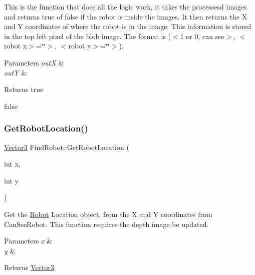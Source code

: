 This is the function that does all the logic work, it takes the processesd images and returns true of false if the robot is inside the images. It then returns the X and Y coordinates of where the robot is in the image. This information is stored in the top left pixel of the blob image. The format is ($<$1 or 0, can see$>$, $<$robot x$>$=\char`\"{}\char`\"{}$>$, $<$robot y$>$=\char`\"{}\char`\"{}$>$). 


\begin{DoxyParams}{Parameters}
{\em outX} & \\
\hline
{\em outY} & \\
\hline
\end{DoxyParams}
\begin{DoxyReturn}{Returns}
true 

false 
\end{DoxyReturn}
\mbox{\label{classFindRobot_acab7123d6f276e150b87ea30f1f287d4}} 
\subsubsection{\texorpdfstring{Get\+Robot\+Location()}{GetRobotLocation()}}
{\footnotesize\ttfamily \hyperlink{classVector3}{Vector3} Find\+Robot\+::\+Get\+Robot\+Location (\begin{DoxyParamCaption}\item[{int}]{x,  }\item[{int}]{y }\end{DoxyParamCaption})\hspace{0.3cm}{\ttfamily [inline]}}



Get the \hyperlink{classRobot}{Robot} Location object, from the X and Y coordinates from Can\+See\+Robot. This function requires the depth image be updated. 


\begin{DoxyParams}{Parameters}
{\em x} & \\
\hline
{\em y} & \\
\hline
\end{DoxyParams}
\begin{DoxyReturn}{Returns}
\hyperlink{classVector3}{Vector3} 
\end{DoxyReturn}
\mbox{\label{classFindRobot_a27fed71d7793129a281fc7a3174d328b}} 
